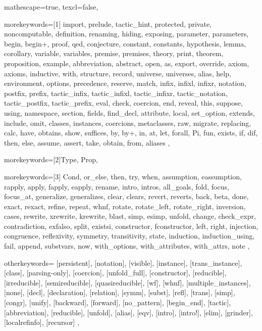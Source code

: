 
 {

mathescape=true,
texcl=false,

morekeywords=[1]{
import, prelude, tactic_hint, protected, private, noncomputable, definition, renaming,
hiding, exposing, parameter, parameters, begin, begin+, proof, qed, conjecture, constant, constants,
hypothesis, lemma, corollary, variable, variables, premise, premises, theory,
print, theorem, proposition, example, abbreviation, abstract,
open, as, export, override, axiom, axioms, inductive, with, structure, record, universe, universes,
alias, help, environment, options, precedence, reserve,
match, infix, infixl, infixr, notation, postfix, prefix,
tactic_infix, tactic_infixl, tactic_infixr, tactic_notation, tactic_postfix, tactic_prefix,
eval, check, coercion, end, reveal, this, suppose,
using, namespace, section, fields, find_decl,
attribute, local, set_option, extends, include, omit, classes,
instances, coercions, metaclasses, raw, migrate, replacing,
calc, have, obtains, show, suffices, by, by+, in, at, let, forall, Pi, fun,
exists, if, dif, then, else, assume, assert, take,
obtain, from, aliases
},

morekeywords=[2]{Type, Prop},

morekeywords=[3]{
Cond, or_else, then, try, when, assumption, eassumption, rapply,
apply, fapply, eapply, rename, intro, intros, all_goals, fold, focus, focus_at,
generalize, generalizes, clear, clears, revert, reverts, back, beta, done, exact, rexact,
refine, repeat, whnf, rotate, rotate_left, rotate_right, inversion, cases, rewrite,
xrewrite, krewrite, blast, simp, esimp, unfold, change, check_expr, contradiction,
exfalso, split, existsi, constructor, fconstructor, left, right, injection, congruence, reflexivity,
symmetry, transitivity, state, induction, induction_using, fail, append,
substvars, now, with_options, with_attributes, with_attrs, note
},

otherkeywords={
[persistent], [notation], [visible], [instance], [trans_instance],
[class], [parsing-only], [coercion], [unfold_full], [constructor],
[reducible], [irreducible], [semireducible], [quasireducible], [wf],
[whnf], [multiple_instances], [none], [decl], [declaration],
[relation], [symm], [subst], [refl], [trans], [simp], [congr], [unify],
[backward], [forward], [no_pattern], [begin_end], [tactic], [abbreviation],
[reducible], [unfold], [alias], [eqv], [intro], [intro!], [elim], [grinder],
[localrefinfo], [recursor]
},

}
